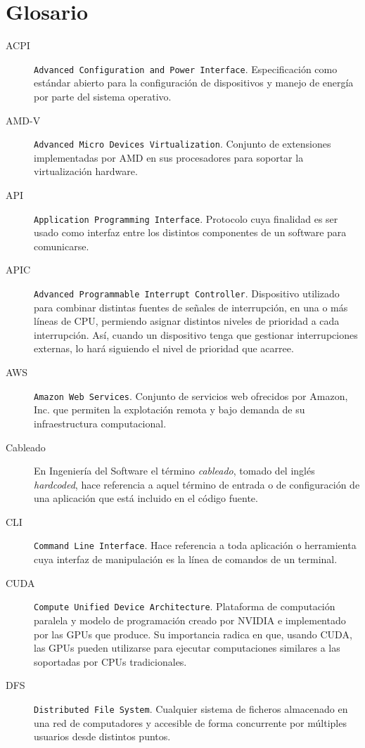 \chapter{Glosario}\label{cap:glosario}
\begin{description}
\item[ACPI] \texttt{Advanced Configuration and Power Interface}. Especificaci\'on como est\'andar abierto para la configuraci\'on de dispositivos y manejo de energ\'ia por parte del sistema operativo.
\item[AMD-V] \texttt{Advanced Micro Devices Virtualization}. Conjunto de extensiones implementadas por AMD en sus procesadores para soportar la virtualizaci\'on hardware.
\item[API] \texttt{Application Programming Interface}. Protocolo cuya finalidad es ser usado como interfaz entre los distintos componentes de un software para comunicarse.
\item[APIC] \texttt{Advanced Programmable Interrupt Controller}. Dispositivo utilizado para combinar distintas fuentes de se\~nales de interrupci\'on, en una o m\'as l\'ineas de CPU, permiendo asignar distintos niveles de prio\-ri\-dad a cada interrupci\'on. As\'i, cuando un dispositivo tenga que gestionar interrupciones externas, lo har\'a siguiendo el nivel de prioridad que acarree.
\item[AWS] \texttt{Amazon Web Services}. Conjunto de servicios web ofrecidos por Amazon, Inc. que permiten la explotaci\'on remota y bajo demanda de su infraestructura computacional.
\item[Cableado] En Ingenier\'ia del Software el t\'ermino \emph{cableado}, tomado del ingl\'es \emph{hardcoded}, hace referencia a aquel t\'ermino de entrada o de configuraci\'on de una aplicaci\'on que est\'a incluido en el c\'odigo fuente.
\item[CLI] \texttt{Command Line Interface}. Hace referencia a toda aplicaci\'on o he\-rra\-mien\-ta cuya interfaz de manipulaci\'on es la l\'inea de comandos de un terminal.
\item[CUDA] \texttt{Compute Unified Device Architecture}. Plataforma de com\-pu\-ta\-ci\'on paralela y modelo de programaci\'on creado por NVIDIA e implementado por las GPUs que produce. Su importancia radica en que, usan\-do CUDA, las GPUs pueden utilizarse para ejecutar computaciones similares a las soportadas por CPUs tradicionales.
\item[DFS] \texttt{Distributed File System}. Cualquier sistema de ficheros almacenado en una red de computadores y accesible de forma concurrente por m\'ultiples usuarios desde distintos puntos.

\end{description}

